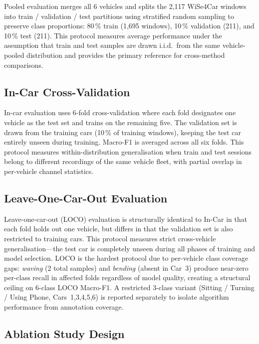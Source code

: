 \documentclass[english,bibtex]{kththesis}
\begin{document}
Pooled evaluation merges all 6 vehicles and splits the 2{,}117 WiSe4Car windows into train / validation / test partitions using stratified random sampling to preserve class proportions: 80\,\% train (1{,}695 windows), 10\,\% validation (211), and 10\,\% test (211). This protocol measures average performance under the assumption that train and test samples are drawn i.i.d.\ from the same vehicle-pooled distribution and provides the primary reference for cross-method comparisons.

\subsection{In-Car Cross-Validation}
\label{sec:incar}

In-car evaluation uses 6-fold cross-validation where each fold designates one vehicle as the test set and trains on the remaining five. The validation set is drawn from the training cars (10\,\% of training windows), keeping the test car entirely unseen during training. Macro-F1 is averaged across all six folds. This protocol measures within-distribution generalisation when train and test sessions belong to different recordings of the same vehicle fleet, with partial overlap in per-vehicle channel statistics.

\subsection{Leave-One-Car-Out Evaluation}
\label{sec:loco}

Leave-one-car-out (LOCO) evaluation is structurally identical to In-Car in that each fold holds out one vehicle, but differs in that the validation set is also restricted to training cars. This protocol measures strict cross-vehicle generalisation---the test car is completely unseen during all phases of training and model selection. LOCO is the hardest protocol due to per-vehicle class coverage gaps: \textit{waving} (2 total samples) and \textit{bending} (absent in Car~3) produce near-zero per-class recall in affected folds regardless of model quality, creating a structural ceiling on 6-class LOCO Macro-F1. A restricted 3-class variant (Sitting / Turning / Using Phone, Cars~1,3,4,5,6) is reported separately to isolate algorithm performance from annotation coverage.

\subsection{Ablation Study Design}
\label{sec:ablation_design}
\end{document}
